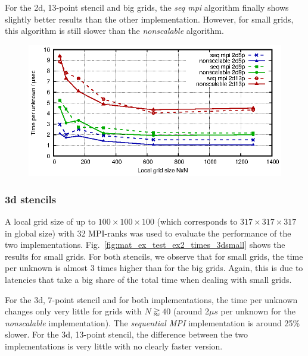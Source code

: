 For the 2d, 13-point stencil and big grids, the \textit{seq mpi} algorithm finally shows slightly better results than the other implementation. However, for small grids, this algorithm is still slower than the \textit{nonscalable} algorithm. 

\begin{figure}[tbp]
	\centering
	\includegraphics[width=1\textwidth]{times_2d}
	\caption{} 
	\label{fig:mat_ex_test_ex2_times_2d}
\end{figure}

\subsubsection*{3d stencils}
A local grid size of up to $100 \times 100 \times 100$ (which corresponds to $317 \times 317 \times 317$ in global size) with 32 MPI-ranks was used to evaluate the performance of the two implementations.  Fig.~\ref{fig:mat_ex_test_ex2_times_3dsmall} shows the results for small grids. For both stencils, we observe that for small grids, the time per unknown is almost 3 times higher than for the big grids. Again, this is due to latencies that take a big share of the total time when dealing with small grids.

For the 3d, 7-point stencil and for both implementations, the time per unknown changes only very little for grids with $N \gtrapprox 40$ (around 2$\mu  s$ per unknown for the \textit{nonscalable} implementation). The \textit{sequential MPI} implementation is around 25\% slower. For the 3d, 13-point stencil, the difference between the two implementations is very little with no clearly faster version. 


